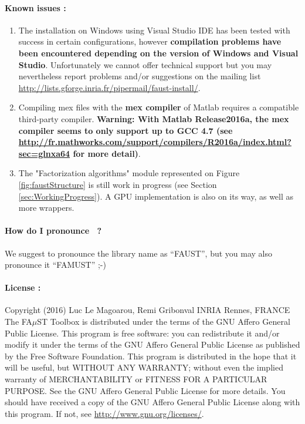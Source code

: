 \paragraph{Known issues :}
\begin{enumerate}
\item The installation on Windows using Visual Studio IDE has been tested with success in certain configurations, however \textbf{compilation problems have been encountered depending on the version of Windows and Visual Studio}. Unfortunately we cannot offer technical support but you may nevertheless report problems and/or suggestions on the mailing list \url{http://lists.gforge.inria.fr/pipermail/faust-install/}. 
 
\item Compiling mex files with the \textbf{mex compiler} of Matlab requires a compatible third-party compiler. \textbf{Warning: With  Matlab Release2016a, the mex compiler seems to only support up to GCC 4.7 (see \url{http://fr.mathworks.com/support/compilers/R2016a/index.html?sec=glnxa64} for more detail)}.

\item The "Factorization algorithms" module represented on Figure \ref{fig:faustStructure} is still work in progress (see Section \ref{sec:WorkingProgress}). A GPU implementation is also on its way, as well as more wrappers.

\end{enumerate}

\paragraph{How do I pronounce \FAuST\ ?} We suggest to pronounce the library name as ``FAUST'', but you may also pronounce it ``FAMUST'' ;-)


\paragraph{License :}Copyright (2016) Luc Le Magoarou, Remi Gribonval INRIA Rennes, FRANCE \\
The FA$\mu$ST Toolbox is distributed under the terms of the GNU Affero General Public License. This program is free software: you can redistribute it and/or modify it under the terms of the GNU Affero General Public License as published by the Free Software Foundation. This program is distributed in the hope that it will be useful, but WITHOUT ANY WARRANTY; without even the implied warranty of MERCHANTABILITY or FITNESS FOR A PARTICULAR PURPOSE.  See the GNU Affero General Public License for more details. You should have received a copy of the GNU Affero General Public License along with this program.  If not, see \url{http://www.gnu.org/licenses/}.


